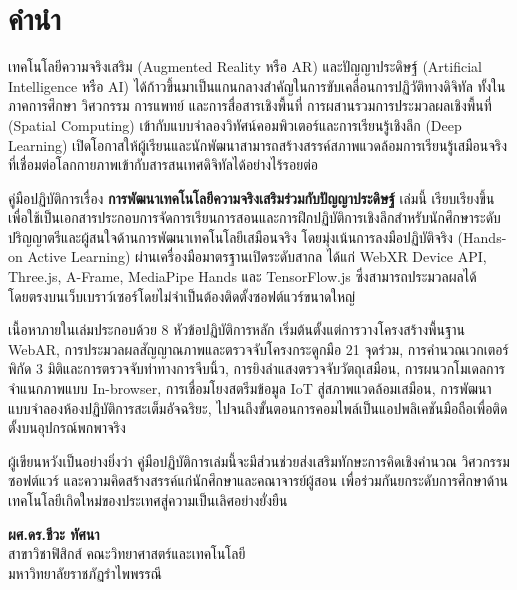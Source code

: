 \chapter*{คำนำ}

เทคโนโลยีความจริงเสริม (Augmented Reality หรือ AR) และปัญญาประดิษฐ์ (Artificial Intelligence หรือ AI) ได้ก้าวขึ้นมาเป็นแกนกลางสำคัญในการขับเคลื่อนการปฏิวัติทางดิจิทัล ทั้งในภาคการศึกษา วิศวกรรม การแพทย์ และการสื่อสารเชิงพื้นที่ การผสานรวมการประมวลผลเชิงพื้นที่ (Spatial Computing) เข้ากับแบบจำลองวิทัศน์คอมพิวเตอร์และการเรียนรู้เชิงลึก (Deep Learning) เปิดโอกาสให้ผู้เรียนและนักพัฒนาสามารถสร้างสรรค์สภาพแวดล้อมการเรียนรู้เสมือนจริงที่เชื่อมต่อโลกกายภาพเข้ากับสารสนเทศดิจิทัลได้อย่างไร้รอยต่อ

คู่มือปฏิบัติการเรื่อง \textbf{การพัฒนาเทคโนโลยีความจริงเสริมร่วมกับปัญญาประดิษฐ์} เล่มนี้ เรียบเรียงขึ้นเพื่อใช้เป็นเอกสารประกอบการจัดการเรียนการสอนและการฝึกปฏิบัติการเชิงลึกสำหรับนักศึกษาระดับปริญญาตรีและผู้สนใจด้านการพัฒนาเทคโนโลยีเสมือนจริง โดยมุ่งเน้นการลงมือปฏิบัติจริง (Hands-on Active Learning) ผ่านเครื่องมือมาตรฐานเปิดระดับสากล ได้แก่ WebXR Device API, Three.js, A-Frame, MediaPipe Hands และ TensorFlow.js ซึ่งสามารถประมวลผลได้โดยตรงบนเว็บเบราว์เซอร์โดยไม่จำเป็นต้องติดตั้งซอฟต์แวร์ขนาดใหญ่

เนื้อหาภายในเล่มประกอบด้วย 8 หัวข้อปฏิบัติการหลัก เริ่มต้นตั้งแต่การวางโครงสร้างพื้นฐาน WebAR, การประมวลผลสัญญาณภาพและตรวจจับโครงกระดูกมือ 21 จุดร่วม, การคำนวณเวกเตอร์พิกัด 3 มิติและการตรวจจับท่าทางการจีบนิ้ว, การยิงลำแสงตรวจจับวัตถุเสมือน, การผนวกโมเดลการจำแนกภาพแบบ In-browser, การเชื่อมโยงสตรีมข้อมูล IoT สู่สภาพแวดล้อมเสมือน, การพัฒนาแบบจำลองห้องปฏิบัติการสะเต็มอัจฉริยะ, ไปจนถึงขั้นตอนการคอมไพล์เป็นแอปพลิเคชันมือถือเพื่อติดตั้งบนอุปกรณ์พกพาจริง

ผู้เขียนหวังเป็นอย่างยิ่งว่า คู่มือปฏิบัติการเล่มนี้จะมีส่วนช่วยส่งเสริมทักษะการคิดเชิงคำนวณ วิศวกรรมซอฟต์แวร์ และความคิดสร้างสรรค์แก่นักศึกษาและคณาจารย์ผู้สอน เพื่อร่วมกันยกระดับการศึกษาด้านเทคโนโลยีเกิดใหม่ของประเทศสู่ความเป็นเลิศอย่างยั่งยืน

\vspace{1.5cm}
\begin{flushright}
\textbf{ผศ.ดร.ชีวะ ทัศนา}\\
สาขาวิชาฟิสิกส์ คณะวิทยาศาสตร์และเทคโนโลยี\\
มหาวิทยาลัยราชภัฏรำไพพรรณี
\end{flushright}

